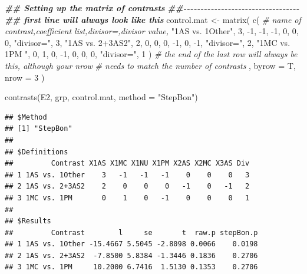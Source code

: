 \documentclass[
]{book}
\newenvironment{Shaded}{\begin{snugshade}}{\end{snugshade}}
\newcommand{\AttributeTok}[1]{\textcolor[rgb]{0.77,0.63,0.00}{#1}}
\newcommand{\CommentTok}[1]{\textcolor[rgb]{0.56,0.35,0.01}{\textit{#1}}}
\newcommand{\DecValTok}[1]{\textcolor[rgb]{0.00,0.00,0.81}{#1}}
\newcommand{\DocumentationTok}[1]{\textcolor[rgb]{0.56,0.35,0.01}{\textbf{\textit{#1}}}}
\newcommand{\FunctionTok}[1]{\textcolor[rgb]{0.00,0.00,0.00}{#1}}
\newcommand{\NormalTok}[1]{#1}
\newcommand{\OtherTok}[1]{\textcolor[rgb]{0.56,0.35,0.01}{#1}}
\newcommand{\SpecialCharTok}[1]{\textcolor[rgb]{0.00,0.00,0.00}{#1}}
\newcommand{\StringTok}[1]{\textcolor[rgb]{0.31,0.60,0.02}{#1}}
\begin{document}
\begin{Shaded}
\begin{Highlighting}[]
\DocumentationTok{\#\# Setting up the matrix of contrasts}
\DocumentationTok{\#\#{-}{-}{-}{-}{-}{-}{-}{-}{-}{-}{-}{-}{-}{-}{-}{-}{-}{-}{-}{-}{-}{-}{-}{-}{-}{-}{-}{-}{-}{-}{-}{-}{-}{-}}
\DocumentationTok{\#\# first line will always look like this}
\NormalTok{control.mat }\OtherTok{\textless{}{-}} \FunctionTok{matrix}\NormalTok{(}
  \FunctionTok{c}\NormalTok{(}
    \CommentTok{\#\textquotesingle{} name of contrast\textquotesingle{},coefficient list,\textquotesingle{}divisor=\textquotesingle{},divisor value,}
    \StringTok{"1AS vs. 1Other"}\NormalTok{, }\DecValTok{3}\NormalTok{, }\SpecialCharTok{{-}}\DecValTok{1}\NormalTok{, }\SpecialCharTok{{-}}\DecValTok{1}\NormalTok{, }\SpecialCharTok{{-}}\DecValTok{1}\NormalTok{, }\DecValTok{0}\NormalTok{, }\DecValTok{0}\NormalTok{, }\DecValTok{0}\NormalTok{, }\StringTok{"divisor="}\NormalTok{, }\DecValTok{3}\NormalTok{,}
    \StringTok{"1AS vs. 2+3AS2"}\NormalTok{, }\DecValTok{2}\NormalTok{, }\DecValTok{0}\NormalTok{, }\DecValTok{0}\NormalTok{, }\DecValTok{0}\NormalTok{, }\SpecialCharTok{{-}}\DecValTok{1}\NormalTok{, }\DecValTok{0}\NormalTok{, }\SpecialCharTok{{-}}\DecValTok{1}\NormalTok{, }\StringTok{"divisor="}\NormalTok{, }\DecValTok{2}\NormalTok{,}
    \StringTok{"1MC vs. 1PM   "}\NormalTok{, }\DecValTok{0}\NormalTok{, }\DecValTok{1}\NormalTok{, }\DecValTok{0}\NormalTok{, }\SpecialCharTok{{-}}\DecValTok{1}\NormalTok{, }\DecValTok{0}\NormalTok{, }\DecValTok{0}\NormalTok{, }\DecValTok{0}\NormalTok{, }\StringTok{"divisor="}\NormalTok{, }\DecValTok{1}
\NormalTok{  )}
  \CommentTok{\# the end of the last row will always be this, although your nrow}
  \CommentTok{\# needs to match the number of contrasts}
\NormalTok{  ,}
  \AttributeTok{byrow =}\NormalTok{ T, }\AttributeTok{nrow =} \DecValTok{3}
\NormalTok{)}

\FunctionTok{contrasts}\NormalTok{(E2, grp, control.mat, }\AttributeTok{method =} \StringTok{"StepBon"}\NormalTok{)}
\end{Highlighting}
\end{Shaded}

\begin{verbatim}
## $Method
## [1] "StepBon"
## 
## $Definitions
##         Contrast X1AS X1MC X1NU X1PM X2AS X2MC X3AS Div
## 1 1AS vs. 1Other    3   -1   -1   -1    0    0    0   3
## 2 1AS vs. 2+3AS2    2    0    0    0   -1    0   -1   2
## 3 1MC vs. 1PM       0    1    0   -1    0    0    0   1
## 
## $Results
##         Contrast        l     se       t  raw.p stepBon.p
## 1 1AS vs. 1Other -15.4667 5.5045 -2.8098 0.0066    0.0198
## 2 1AS vs. 2+3AS2  -7.8500 5.8384 -1.3446 0.1836    0.2706
## 3 1MC vs. 1PM     10.2000 6.7416  1.5130 0.1353    0.2706
\end{verbatim}
\end{document}
